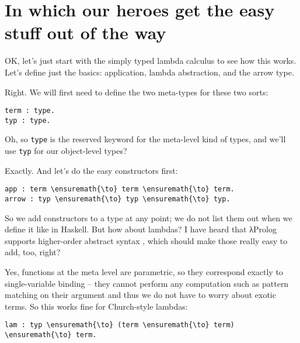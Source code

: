 \section{In which our heroes get the easy stuff out of the
way}\label{in-which-our-heroes-get-the-easy-stuff-out-of-the-way}

\heroSTUDENT{} OK, let's just start with the simply typed lambda calculus to
see how this works. Let's define just the basics: application, lambda
abstraction, and the arrow type.

\heroADVISOR{} Right. We will first need to define the two meta-types for
these two sorts:

\importantCodeblock{}

\begin{verbatim}
term : type.
typ : type.
\end{verbatim}

\importantCodeblockEnd{}

\heroSTUDENT{} Oh, so \texttt{type} is the reserved keyword for the meta-level
kind of types, and we'll use \texttt{typ} for our object-level types?

\heroADVISOR{} Exactly. And let's do the easy constructors first:

\importantCodeblock{}

\begin{verbatim}
app : term \ensuremath{\to} term \ensuremath{\to} term.
arrow : typ \ensuremath{\to} typ \ensuremath{\to} typ.
\end{verbatim}

\importantCodeblockEnd{}

\heroSTUDENT{} So we add constructors to a type at any point; we do not list
them out when we define it like in Haskell. But how about lambdas? I
have heard that \foreignlanguage{greek}{λ}Prolog supports higher-order abstract syntax
\citep{hoas-standard-reference}, which should make those really easy to
add, too, right?

\heroADVISOR{} Yes, functions at the meta level are parametric, so they
correspond exactly to single-variable binding -- they cannot perform any
computation such as pattern matching on their argument and thus we do
not have to worry about exotic terms. So this works fine for
Church-style lambdas:

\importantCodeblock{}

\begin{verbatim}
lam : typ \ensuremath{\to} (term \ensuremath{\to} term) \ensuremath{\to} term.
\end{verbatim}

